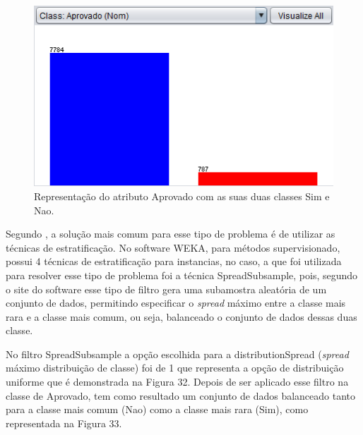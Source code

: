 \par
\begin{figure}[!htp]
	\begin{center}
    \caption{\label{fig:waveform_fig} Representação do atributo Aprovado com as suas duas classes Sim e Nao.}
	\includegraphics[scale=0.90]{Figuras/Atributo_aprovado.png}
	\end{center}
\end{figure}

\par
\textcolor{red}{}


\par
Segundo , a solução mais comum para esse tipo de problema é de utilizar as técnicas de estratificação. No software WEKA, para métodos supervisionado, possui 4 técnicas de estratificação para instancias, no caso, a que foi utilizada para resolver esse tipo de problema foi a técnica SpreadSubsample, pois, segundo o site do software  esse tipo de filtro gera uma subamostra aleatória de um conjunto de dados, permitindo especificar o \textit{spread} máximo entre a classe mais rara e a classe mais comum, ou seja, balanceado o conjunto de dados dessas duas classe.

\par
No filtro SpreadSubsample a opção escolhida para a distributionSpread (\textit{spread} máximo distribuição de classe) foi de 1 que representa a opção de distribuição uniforme que é demonstrada na Figura 32. Depois de ser aplicado esse filtro na classe de Aprovado, tem como resultado um conjunto de dados balanceado tanto para a classe mais comum (Nao) como a classe mais rara (Sim), como representada na Figura 33.

